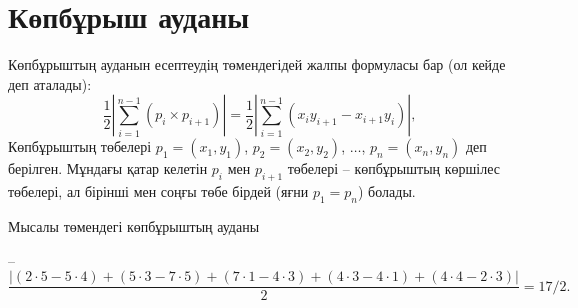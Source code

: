 
\section{Көпбұрыш ауданы}

Көпбұрыштың ауданын есептеудің төмендегідей жалпы формуласы 
бар (ол кейде  деп аталады):
\[\frac{1}{2} |\sum_{i=1}^{n-1} (p_i \times p_{i+1})| =
\frac{1}{2} |\sum_{i=1}^{n-1} (x_i y_{i+1} - x_{i+1} y_i)|, \]
Көпбұрыштың төбелері 
$p_1=(x_1,y_1)$, $p_2=(x_2,y_2)$, $\ldots$, $p_n=(x_n,y_n)$ деп берілген.
Мұндағы қатар келетін $p_i$ мен $p_{i+1}$ төбелері -- көпбұрыштың көршілес
төбелері, ал бірінші мен соңғы төбе бірдей (яғни $p_1=p_n$) болады.

Мысалы төмендегі көпбұрыштың ауданы
\begin{center}
\end{center}
--
\[\frac{|(2\cdot5-5\cdot4)+(5\cdot3-7\cdot5)+(7\cdot1-4\cdot3)+(4\cdot3-4\cdot1)+(4\cdot4-2\cdot3)|}{2} = 17/2.\]


